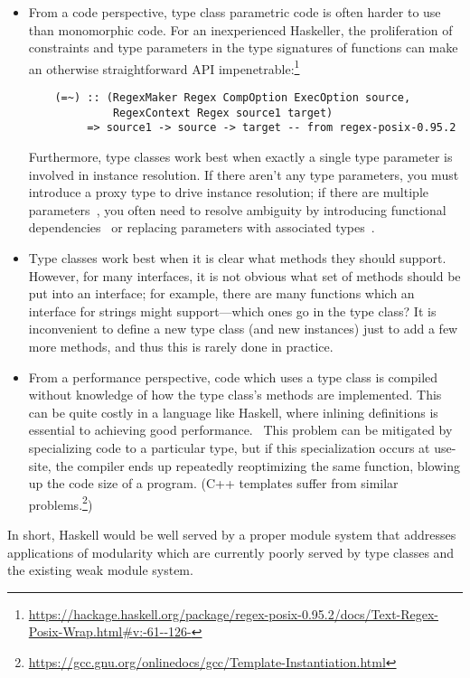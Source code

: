 \begin{itemize}
    \item From a code perspective, type class parametric code is often
    harder to use than monomorphic code.  For an inexperienced
    Haskeller, the proliferation of constraints and type parameters in the
    type signatures of functions can make an otherwise straightforward
    API impenetrable:\footnote{\url{https://hackage.haskell.org/package/regex-posix-0.95.2/docs/Text-Regex-Posix-Wrap.html#v:-61--126-}}
    \begin{lstlisting}
    (=~) :: (RegexMaker Regex CompOption ExecOption source,
             RegexContext Regex source1 target)
         => source1 -> source -> target -- from regex-posix-0.95.2
    \end{lstlisting}
    Furthermore, type classes work best when exactly a single type
    parameter is involved in instance resolution. If there aren't any type
    parameters, you must introduce a proxy type to drive instance resolution; if
    there are multiple parameters~\cite{lfp92}, you often need to resolve ambiguity
    by introducing functional
    dependencies~\cite{Jones:2000:TCF:645394.651909} or replacing
    parameters with associated types~\cite{towards-open-type-functions-haskell}.

    \item Type classes work best when it is clear what methods they
    should support.  However, for many interfaces, it is not obvious
    what set of methods should be put into an interface; for example,
    there are many functions which an interface for strings might
    support---which ones go in the type class?  It is inconvenient
    to define a new type class (and new instances) just to add a
    few more methods, and thus this is rarely done in practice.

    \item From a performance perspective, code which uses a type class
    is compiled without knowledge of how the type class's
    methods are implemented.  This can be quite costly in a language
    like Haskell, where inlining definitions is essential to achieving
    good performance.~\cite{PeytonJones:2002:SGH:968417.968422}  This problem can
    be mitigated by specializing code to a particular type, but if this
    specialization occurs at use-site, the compiler ends up repeatedly reoptimizing
    the same function, blowing up the code size of
    a program. (C++ templates suffer from similar problems.\footnote{\url{https://gcc.gnu.org/onlinedocs/gcc/Template-Instantiation.html}})
\end{itemize}
%
In short, Haskell would be well served by a proper module system that
addresses applications of modularity which are currently poorly served
by type classes and the existing weak module system.


